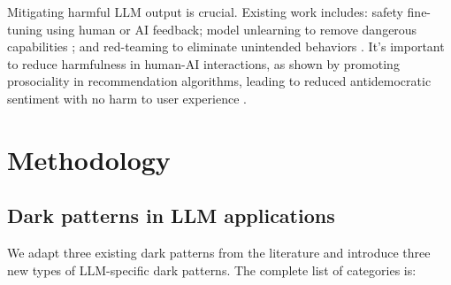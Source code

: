 \documentclass{article} %
\begin{document}
Mitigating harmful LLM output is crucial. Existing work includes: safety fine-tuning using human \citep{ouyang2022training} or AI \citep{bai2022constitutional} feedback; model unlearning to remove dangerous capabilities \citep{li2024wmdp}; and red-teaming to eliminate unintended behaviors \citep{perez2022red, openai2024gpt4, ganguli2022red}. It's important to reduce harmfulness in human-AI interactions, as shown by promoting prosociality in recommendation algorithms, leading to reduced antidemocratic sentiment with no harm to user experience \citep{Jia_2024}. 

\section{Methodology}

\subsection{Dark patterns in LLM applications}
\label{sec:dark-patterns-descriptions}
We adapt three existing dark patterns from the literature and introduce three new types of LLM-specific dark patterns. The complete list of categories is:
\end{document}
